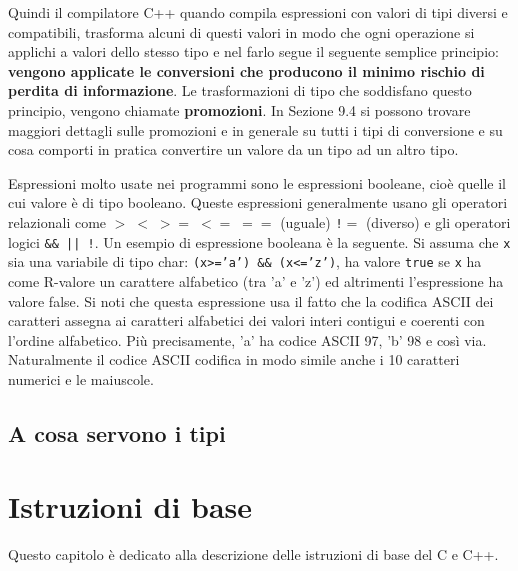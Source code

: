 Quindi il compilatore C++ quando compila espressioni con valori di tipi diversi e compatibili, trasforma alcuni di questi valori in modo che ogni operazione si applichi a valori dello stesso tipo e nel farlo segue il seguente semplice principio: \textbf{vengono applicate le conversioni che producono il minimo rischio di perdita di informazione}.
Le trasformazioni di tipo che soddisfano questo principio, vengono chiamate \textbf{promozioni}.
In Sezione 9.4 si possono trovare maggiori dettagli sulle promozioni e in generale su tutti i tipi di conversione e su cosa comporti in pratica convertire un valore da un tipo ad un altro tipo. 

Espressioni molto usate nei programmi sono le espressioni booleane, cioè quelle il cui valore è di tipo booleano.
Queste espressioni generalmente usano gli operatori relazionali come \texttt{$> \; < \; >= \; <= \; ==$} (uguale) \texttt{!$=$} (diverso) e gli operatori logici \texttt{\&\& || !}.
Un esempio di espressione booleana è la seguente.
Si assuma che \texttt{x} sia una variabile di tipo char: \texttt{(x>='a') \&\& (x<='z')}, ha valore \texttt{true} se \texttt{x} ha come R-valore un carattere alfabetico (tra 'a' e 'z') ed altrimenti l'espressione ha valore false.
Si noti che questa espressione usa il fatto che la codifica ASCII dei caratteri assegna ai caratteri alfabetici dei valori interi contigui e coerenti con l'ordine alfabetico.
Più precisamente, 'a' ha codice ASCII 97, 'b' 98 e così via.
Naturalmente il codice ASCII codifica in modo simile anche i 10 caratteri numerici e le maiuscole. 











\section{A cosa servono i tipi}














\chapter{Istruzioni di base}
Questo capitolo è dedicato alla descrizione delle istruzioni di base del C e C++.

